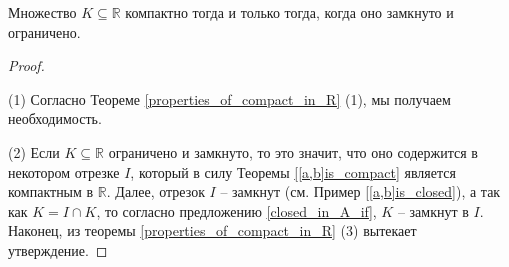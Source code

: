 \begin{theorem}\label{criterai_of_compacness_in_R}
Множество $K \subseteq \mathbb{R}$ компактно тогда и только тогда, когда оно замкнуто и ограничено.    
\end{theorem}
\begin{proof}~

(1) Согласно Теореме \ref{properties_of_compact_in_R} (1), мы получаем необходимость.

(2) Если $K \subseteq \mathbb{R}$ ограничено и замкнуто, то это значит, что оно содержится в некотором отрезке $I$, который в силу Теоремы \ref{[a,b]is_compact} является компактным в $\mathbb{R}$. Далее, отрезок $I$ -- замкнут (см. Пример \ref{[a,b]is_closed}), а так как $K = I \cap K$, то согласно предложению \ref{closed_in_A_if}, $K$ -- замкнут в $I$. Наконец, из теоремы \ref{properties_of_compact_in_R} (3) вытекает утверждение. 
\end{proof}

